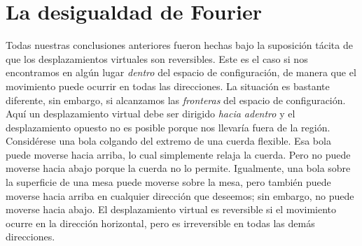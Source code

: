 \section{La desigualdad de Fourier}

Todas nuestras conclusiones anteriores fueron hechas bajo la suposición tácita de que los desplazamientos virtuales son reversibles. Este es el caso si nos encontramos en algún lugar \emph{dentro} del espacio de configuración, de manera que el movimiento puede ocurrir en todas las direcciones. La situación es bastante diferente, sin embargo, si alcanzamos las \emph{fronteras} del espacio de configuración. Aquí un desplazamiento virtual debe ser dirigido \emph{hacia adentro} y el desplazamiento opuesto no es posible porque nos llevaría fuera de la región. Considérese una bola colgando del extremo de una cuerda flexible. Esa bola puede moverse hacia arriba, lo cual simplemente relaja la cuerda. Pero no puede moverse hacia abajo porque la cuerda no lo permite. Igualmente, una bola sobre la superficie de una mesa puede moverse sobre la mesa, pero también puede moverse hacia arriba en cualquier dirección que deseemos; sin embargo, no puede moverse hacia abajo. El desplazamiento virtual es reversible si el movimiento ocurre en la dirección horizontal, pero es irreversible en todas las demás direcciones.

